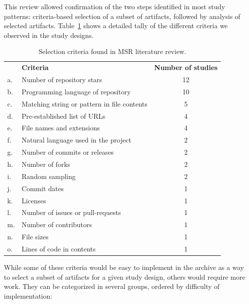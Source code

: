 This review allowed confirmation of the two steps identified in most study
patterns: criteria-based selection of a subset of artifacts, followed by
analysis of selected artifacts. Table~\ref{tab:selection-criteria} shows a
detailed tally of the different criteria we observed in the study designs.

\begin{table}
    \begin{tabular}{l l c}
        & \textbf{Criteria} & \textbf{Number of studies} \\
         a. & Number of repository stars & 12 \\
         b. & Programming language of repository & 10 \\
         c. & Matching string or pattern in file contents & 5 \\
         d. & Pre-established list of URLs & 4 \\
         e. & File names and extensions & 4 \\
         f. & Natural language used in the project & 2 \\
         g. & Number of commits or releases & 2 \\
         h. & Number of forks & 2 \\
         i. & Random sampling & 2 \\
         j. & Commit dates & 1 \\
         k. & Licenses & 1 \\
         l. & Number of issues or pull-requests & 1 \\
         m. & Number of contributors & 1 \\
         n. & File sizes & 1 \\
         o. & Lines of code in contents & 1 \\
    \end{tabular}
    \centering
    \caption{Selection criteria found in MSR literature review.}%
    \label{tab:selection-criteria}
\end{table}

While some of these criteria would be easy to implement in the archive as a way
to select a subset of artifacts for a given study design, others would require
more work. They can be categorized in several groups, ordered by difficulty of
implementation:

